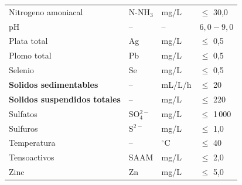 \documentclass[12pt,a4paper]{article}
\begin{document}
\begin{longtable}{p{4.5cm}p{2.0cm}p{2.0cm}p{3.5cm}}
Nitrogeno amoniacal & N-NH$_3$ & mg/L & $\leq$ 30,0 \\
pH & -- & -- & $6,0 - 9,0$ \\
Plata total & Ag & mg/L & $\leq$ 0,5 \\
Plomo total & Pb & mg/L & $\leq$ 0,5 \\
Selenio & Se & mg/L & $\leq$ 0,5 \\
\textbf{Solidos sedimentables} & -- & mL/L/h & $\leq$ 20 \\
\textbf{Solidos suspendidos totales} & -- & mg/L & $\leq$ 220 \\
Sulfatos & SO$_4^{2-}$ & mg/L & $\leq$ 1\,000 \\
Sulfuros & S$^{2-}$ & mg/L & $\leq$ 1,0 \\
Temperatura & -- & $^\circ$C & $\leq$ 40 \\
Tensoactivos & SAAM & mg/L & $\leq$ 2,0 \\
Zinc & Zn & mg/L & $\leq$ 5,0 \\
\end{longtable}
\end{document}
